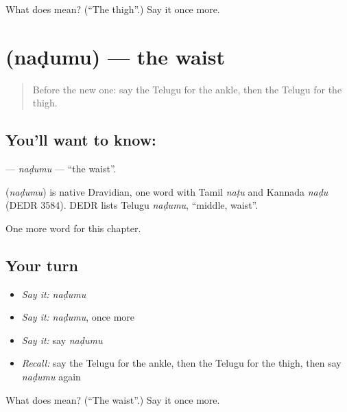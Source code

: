 \begin{tcolorbox}[breakable,colback=teal!4,colframe=teal!35!black,title={Before you move on}]
What does  mean? (\textquotedblleft{}The thigh\textquotedblright{}.) Say it once more.
\end{tcolorbox}
\section[\texorpdfstring{\te{నడుము} (naḍumu)}{నడుము (naḍumu)}]{ (naḍumu) — the waist}

\label{lesson:TE-C250-nadumu}



\begin{quote}
Before the new one: say the Telugu for the ankle, then the Telugu for the thigh.
\end{quote}

\subsection*{You'll want to know: }
\textbf{} — \emph{naḍumu} — \textquotedblleft{}the waist\textquotedblright{}.

\begin{cousinweb}
\textbf{} (\emph{naḍumu}) is native Dravidian, one word with Tamil \emph{naṭu} and Kannada \emph{naḍu} (DEDR 3584). DEDR lists Telugu \emph{naḍumu}, \textquotedblleft{}middle, waist\textquotedblright{}.
\end{cousinweb}

\begin{grammarlens}[title={What you've built}]
One more word for this chapter.
\end{grammarlens}

\subsection*{Your turn}
\begin{itemize}
\raggedright
  \item \emph{Say it:} \emph{naḍumu}
  \item \emph{Say it:} \emph{naḍumu}, once more
  \item \emph{Say it:} say \emph{naḍumu}
  \item \emph{Recall:} say the Telugu for the ankle, then the Telugu for the thigh, then say \emph{naḍumu} again
\end{itemize}

\begin{tcolorbox}[breakable,colback=teal!4,colframe=teal!35!black,title={Before you move on}]
What does  mean? (\textquotedblleft{}The waist\textquotedblright{}.) Say it once more.
\end{tcolorbox}
